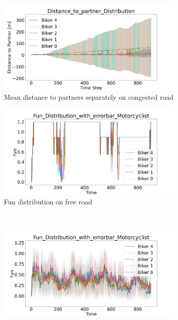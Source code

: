 \begin{figure}[H]
    \centering
        \begin{subfigure}[b]{0.45\textwidth}
        \centering
        \includegraphics[width=1.0\textwidth]{images/Kaltenbronner/Kaltenbronner_Distance_to_partner_distribution_congested.png}
        \caption{Mean distance to partners separately on congested road}
    \end{subfigure}
    \hfill
    \begin{subfigure}[b]{0.45\textwidth}
        \centering
        \includegraphics[width=1.0\textwidth]{images/Kaltenbronner/Kaltenbronner _Fun_Distribution_with_errorbar_free.png}
        \caption{Fun distribution on free road}
    \end{subfigure}
    \\
    \begin{subfigure}[b]{0.45\textwidth}
        \centering
        \includegraphics[width=1.0\textwidth]{images/Kaltenbronner/Kaltenbronner_Fun_Distribution_with_errorbar_congested.png}

\end{subfigure}
\end{figure}
